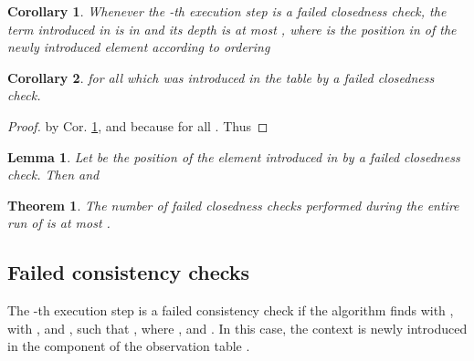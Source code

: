 \documentclass[preprint,12pt,english]{article}
\newtheorem{lemma}{Lemma}
\newtheorem{corollary}{Corollary}
\newtheorem{theorem}{Theorem}
\begin{document}
\begin{corollary}
\label{cor3}
Whenever the -th execution step is a failed closedness check, the term introduced in  is in  and its depth is at most , where  is the position in  of the newly introduced element  according to  ordering 
\end{corollary}

\begin{corollary}
\label{mmon}
 for all  which was introduced in the table by a failed closedness check.
\end{corollary}
\begin{proof}
 by Cor. \ref{cor3}, and  because  for all . Thus  
\end{proof}
\begin{lemma}
\label{cor4}
Let  be the position of the element  introduced in  by a failed closedness check. Then 
 and 
\end{lemma}

\begin{theorem}
\label{tyury}
The number of failed closedness checks performed during the entire run of  is at most .
\end{theorem}
\subsection{Failed consistency checks}
The -th execution step is a failed consistency check if the algorithm finds   with ,  with , and , such that   ,  where , and . In this case, the context  is newly introduced in the component  of the observation table .
\end{document}
